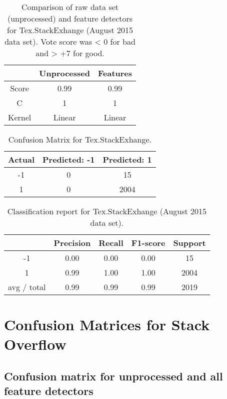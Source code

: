 \begin{table}[!h]%
	\centering
	\begin{tabular}{| c | c | c |}
		\hline
		~ 			& Unprocessed		& Features	\\ \hline
		Score 		& 0.99				& 0.99		\\ \hline
		C			& 1					& 1			\\ \hline
		Kernel		& Linear			& Linear	\\ \hline
	\end{tabular}
\caption{Comparison of raw data set (unprocessed) and feature detectors for Tex.StackExhange (August 2015 data set). Vote score was < 0 for bad and > +7 for good.}
\label{tab:singular_feature_detector_tex}
\end{table}

\begin{table}[!h]%
	\centering
	\begin{tabular}{| c | c | c |}
		\hline
		Actual 		& Predicted: -1	& Predicted: 1	\\ \hline
		-1			& 0			& 15				\\ \hline
		1			& 0			& 2004				\\ \hline
	\end{tabular}
	\caption{Confusion Matrix for Tex.StackExhange.}
	\label{tab:confusion_matrix_tex}
\end{table}

\begin{table}[!h]%
	\centering
	\begin{tabular}{| c | c | c | c | c |}
		\hline
		~				& Precision		& Recall	& F1-score		& Support	\\ \hline
		-1      		& 0.00			& 0.00		& 0.00			& 15		\\ \hline
		1       		& 0.99			& 1.00		& 1.00			& 2004		\\ \hline
		avg / total		& 0.99			& 0.99		& 0.99			& 2019		\\ \hline
	\end{tabular}
	\caption{Classification report for Tex.StackExhange (August 2015 data set).}
	\label{tab:tex_classification_report}
\end{table}

\clearpage
\section{Confusion Matrices for Stack Overflow}
\label{app:confusion_matrix}
\subsection{Confusion matrix for unprocessed and all feature detectors}

